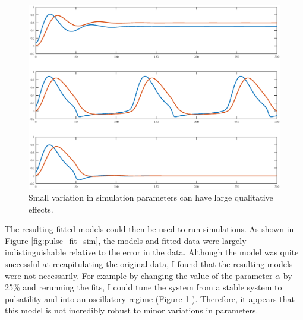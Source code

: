 \begin{figure}[h!]
	\centering
	\includegraphics[width=\hsize]{pulse/model_compare.eps}
	\caption{\label{fig:pulse_fit_compare}  Small variation in simulation parameters can have large qualitative effects.}
\end{figure}

The resulting fitted models could then be used to run simulations.  As shown in Figure \ref{fig:pulse_fit_sim}, the models and fitted data were largely indistinguishable relative to the error in the data.  Although the model was quite successful at recapitulating the original data, I found that the resulting models were not necessarily.  For example by changing the value of the parameter $\alpha$ by 25\% and rerunning the fits, I could tune the system from a stable system to pulsatility and into an oscillatory regime (Figure \ref{fig:pulse_fit_compare} ).  Therefore, it appears that this model is not incredibly robust to minor variations in parameters. 


